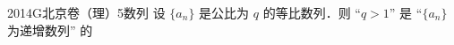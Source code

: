 
\begin{problem}{2014}{G}{北京卷（理）}{5}{数列}
设 $ \{a_n\} $ 是公比为 $ q $ 的等比数列．则 “$ q>1 $” 是 “$ \{a_n\} $ 为递增数列” 的
\begin{choices}
\end{choices}
\end{problem}

\begin{answer}

\end{answer}

\begin{solutions}

\end{solutions}